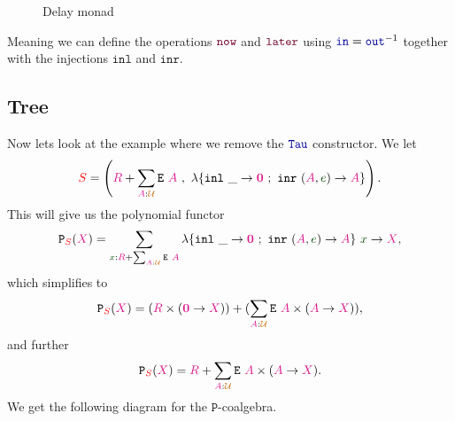 \documentclass[twoside,11pt,openright]{report}
\theoremstyle{plain} %
\theoremstyle{definition}
\theoremstyle{remark}
\newcommand*{\term}[1]{\textcolor{green!30!black}{#1}} %
\newcommand*{\type}[1]{\textcolor{magenta!90!black}{#1}}
\newcommand*{\container}[1]{\textcolor{red}{#1}}
\newcommand*{\universe}[1]{\textcolor{orange!80!black}{#1}}
\newcommand*{\empt}{\type{\textbf{0}}}
\newcommand*{\function}[1]{\textcolor{blue!60!black}{\ensuremath{\mathtt{#1}}}}
\newcommand*{\constructor}[1]{\textcolor{purple!60!black}{\ensuremath{\mathtt{#1}}}}
\newcommand*{\typeformer}[1]{\ensuremath{\mathtt{#1}}}
\newcommand*{\functor}[1]{\ensuremath{\mathbf{\mathtt{#1}}}}
\begin{document}
\begin{figure}[h]
  \centering
  \caption{Delay monad}
\end{figure}
\noindent Meaning we can define the operations \(\constructor{now}\) and \(\constructor{later}\) using \(\function{in} = \function{out}^{-1}\) together with the injections \(\mathtt{inl}\) and \(\mathtt{inr}\). 

\subsection{Tree}
Now lets look at the example where we remove the \(\function{Tau}\) constructor. We let
\begin{equation}
  \container{S} = \left(\type{R} + \sum_{\type{A} : \universe{\mathcal{U}}} \typeformer{E}~\type{A}~,~\lambda \{ \texttt{inl}~\_ \rightarrow \empt ~;~ \texttt{inr}~(\type{A},\term{e}) \rightarrow \type{A} \} \right).
\end{equation}
This will give us the polynomial functor
\begin{equation}
  \functor{P}_{\container{S}}(\type{X}) = \sum_{\term{x} : \type{R} + \sum_{\type{A} : \universe{\mathcal{U}}} \typeformer{E}~\type{A}} \lambda \{ \texttt{inl}~\_ \rightarrow \empt ~;~ \texttt{inr}~(\type{A},\term{e}) \rightarrow \type{A} \}~\term{x} \rightarrow \type{X},
\end{equation}
which simplifies to
\begin{equation}
  \functor{P}_{\container{S}}(\type{X}) = (\type{R} \times (\empt \rightarrow \type{X})) + (\sum_{\type{A} : \universe{\mathcal{U}}} \typeformer{E}~\type{A} \times (\type{A} \rightarrow \type{X})),
\end{equation}
and further
\begin{equation}
  \functor{P}_{\container{S}}(\type{X}) = \type{R} + \sum_{\type{A} : \universe{\mathcal{U}}} \typeformer{E}~\type{A} \times (\type{A} \rightarrow \type{X}).
\end{equation}
We get the following diagram for the \(\functor{P}\)-coalgebra.
\end{document}
